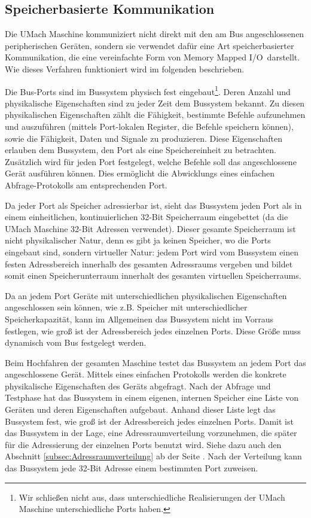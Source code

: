 \subsection{Speicherbasierte Kommunikation}

Die UMach Maschine kommuniziert nicht direkt mit den am Bus angeschlossenen
peripherischen Geräten, sondern sie verwendet dafür eine Art speicherbasierter
Kommunikation, die eine vereinfachte Form von \glqq Memory Mapped I/O\grqq\
darstellt. Wie dieses Verfahren funktioniert wird im
folgenden beschrieben.

Die Bus-Ports sind im Bussystem physisch fest
eingebaut\footnote{Wir schließen nicht aus, dass unterschiedliche Realisierungen
der UMach Maschine unterschiedliche Ports haben.}. Deren Anzahl und
physikalische Eigenschaften sind zu jeder Zeit dem Bussystem bekannt. Zu diesen
physikalischen Eigenschaften zählt die Fähigkeit, bestimmte Befehle aufzunehmen
und auszuführen (mittels Port-lokalen Register, die Befehle speichern können),
sowie die Fähigkeit, Daten und Signale zu produzieren. Diese Eigenschaften
erlauben dem Bussystem, den Port als eine Speichereinheit zu betrachten. 
Zusätzlich wird für jeden Port festgelegt, welche Befehle soll das
angeschlossene Gerät ausführen können.
Dies ermöglicht die Abwicklungs eines einfachen Abfrage-Protokolls am
entsprechenden Port.

Da jeder Port als Speicher adressierbar ist, sieht das Bussystem jeden Port als
in einem einheitlichen, kontinuierlichen 32-Bit Speicherraum eingebettet (da
die UMach Maschine 32-Bit Adressen verwendet). Dieser gesamte Speicherraum ist
nicht physikalischer Natur, denn es gibt ja keinen Speicher, wo die Ports
eingebaut sind, sondern virtueller Natur: jedem Port wird vom Bussystem einen
festen Adressbereich innerhalb des gesamten Adressraums vergeben und bildet
somit einen Speicherunterraum\index{Speicherunterraum} innerhalt des gesamten
virtuellen Speicherraums.

Da an jedem Port Geräte mit unterschiedlichen physikalischen Eigenschaften
angeschlossen sein können, wie z.B. Speicher mit unterschiedlicher
Speicherkapazität, kann im Allgemeinen das Bussystem nicht im Vorraus festlegen,
wie groß ist der Adressbereich jedes einzelnen Ports. Diese Größe muss dynamisch
vom Bus festgelegt werden.

Beim Hochfahren der gesamten Maschine testet das Bussystem an jedem Port das
angeschlossene Gerät. Mittels eines einfachen Protokolls werden die konkrete
physikalische Eigenschaften des Geräts abgefragt. Nach der Abfrage und Testphase
hat das Bussystem in einem eigenen, internen Speicher eine Liste von Geräten und
deren Eigenschaften aufgebaut. Anhand dieser Liste legt das Bussystem fest, wie
groß ist der Adressbereich jedes einzelnen Ports. Damit ist das Bussystem in der
Lage, eine Adressraumverteilung vorzunehmen, die später für die Adressierung der
einzelnen Ports benutzt wird. Siehe dazu auch den Abschnitt
\ref{subsec:Adressraumverteilung} ab der Seite
\pageref{subsec:Adressraumverteilung}.
Nach der Verteilung kann das Bussystem jede 32-Bit Adresse einem bestimmten Port
zuweisen.

